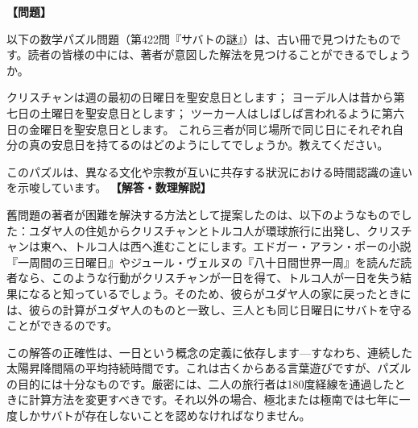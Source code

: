 \documentclass[10pt,a4paper,oneside,openany]{ltjsbook}
\begin{document}
\begin{tcolorbox}[colback=softblue,colframe=primaryblue,title=\textbf{第 422 問：土曜日パズル （原題: THE SABBATH PUZZLE.）},arc=2mm,boxrule=1pt,breakable]
\textbf{【問題】}\par\vspace{0.3em}
以下の数学パズル問題（第422問『サバトの謎』）は、古い冊で見つけたものです。読者の皆様の中には、著者が意図した解法を見つけることができるでしょうか。

    クリスチャンは週の最初の日曜日を聖安息日とします；
    ヨーデル人は昔から第七日の土曜日を聖安息日とします；
    ツーカー人はしばしば言われるように第六日の金曜日を聖安息日とします。
    これら三者が同じ場所で同じ日にそれぞれ自分の真の安息日を持てるのはどのようにしてでしょうか。教えてください。

このパズルは、異なる文化や宗教が互いに共存する狀況における時間認識の違いを示唆しています。
\tcblower
\textbf{【解答・数理解説】}\par\vspace{0.3em}
舊問題の著者が困難を解決する方法として提案したのは、以下のようなものでした：ユダヤ人の住処からクリスチャンとトルコ人が環球旅行に出発し、クリスチャンは東へ、トルコ人は西へ進むことにします。エドガー・アラン・ポーの小説『一周間の三日曜日』やジュール・ヴェルヌの『八十日間世界一周』を読んだ読者なら、このような行動がクリスチャンが一日を得て、トルコ人が一日を失う結果になると知っているでしょう。そのため、彼らがユダヤ人の家に戻ったときには、彼らの計算がユダヤ人のものと一致し、三人とも同じ日曜日にサバトを守ることができるのです。

この解答の正確性は、一日という概念の定義に依存します—すなわち、連続した太陽昇降間隔の平均持続時間です。これは古くからある言葉遊びですが、パズルの目的には十分なものです。厳密には、二人の旅行者は180度経線を通過したときに計算方法を変更すべきです。それ以外の場合、極北または極南では七年に一度しかサバトが存在しないことを認めなければなりません。
\end{tcolorbox}
\end{document}
